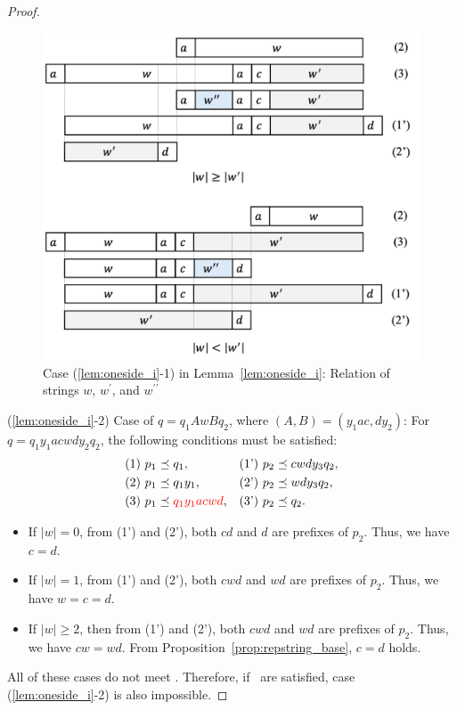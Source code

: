 \begin{proof}
  \begin{figure}[t]
    \begin{center}
      \includegraphics[scale=0.345]{figs/centerproof2.pdf}
      \caption{Case (\ref{lem:oneside_i}-1) in Lemma~\ref{lem:oneside_i}: Relation of strings $w$, $w^{\prime}$, and $w^{\prime\prime}$}\label{fig:centerproof2}
    \end{center}
    \end{figure}

\smallskip

\noindent
(\ref{lem:oneside_i}-2) Case of $q=q_{1}AwBq_{2}$, where {\color{red}$( A,B ) = ( y_{1}ac,dy_{2} )$}:
For $q=q_{1}y_{1}acwdy_{2}q_{2}$, the following conditions must be satisfied:
\begin{align*}
  \textrm{(1)}~& p_{1} \preceq q_{1}, & \textrm{(1')}~& p_{2} \preceq cwdy_{3}q_{2}, \\
  \textrm{(2)}~& p_{1} \preceq q_{1}y_{1}, & \textrm{(2')}~& p_{2} \preceq wdy_{3}q_{2}, \\
  \textrm{(3)}~& p_{1} \preceq {\color{red}q_{1}y_{1}acwd}, & \textrm{(3')}~& p_{2} \preceq q_{2}.
\end{align*}

\begin{itemize}
\item If $|w|=0$, from (1') and (2'), {\color{red} both $cd$ and $d$ are prefixes of $p_{2}$}. Thus, we have $c=d$.
\item If $|w|=1$, from (1') and (2'), {\color{red} both $cwd$ and $wd$ are prefixes of $p_{2}$}. Thus, we have $w=c=d$.
\item If $|w| \ge 2$, then from (1') and (2'), {\color{red}both} $cwd$ and $wd$ are prefixes of $p_{2}$. Thus, we have $cw=wd$. From Proposition~\ref{prop:repstring_base}, $c=d$ holds.
\end{itemize}
All of these cases do not meet \TheConditionB.
Therefore, if \TheConditionB\ are satisfied, case (\ref{lem:oneside_i}-2) is also impossible.


\end{proof}

